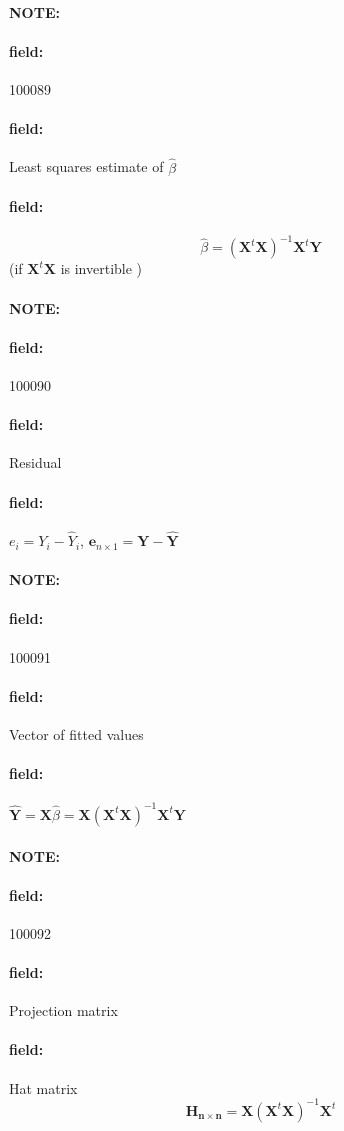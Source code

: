 \documentclass[12pt]{article}
\newenvironment{note}{\paragraph{NOTE:}}{}
\newenvironment{field}{\paragraph{field:}}{}
\begin{document}
\begin{note} \begin{field} \tiny 100089 \end{field}
 \begin{field}
  Least squares estimate of $\hat{\beta}$
 \end{field}
 \begin{field}
  $$ \hat{\beta} = (\mathbf{X}^t \mathbf{X})^{-1} \mathbf{X}^t \mathbf{Y} $$ (if $\mathbf{X}^t \mathbf{X}$ is invertible )
 \end{field}
\end{note}

\begin{note} \begin{field} \tiny 100090 \end{field}
 \begin{field}
  Residual
 \end{field}
 \begin{field}
  $e_i = Y_i - \hat{Y}_i$, $\mathbf{e}_{n\times 1} = \mathbf{Y} - \hat{\mathbf{Y}}$
 \end{field}
\end{note}

\begin{note} \begin{field} \tiny 100091 \end{field}
 \begin{field}
  Vector of fitted values
 \end{field}
 \begin{field}
  $\hat{\mathbf{Y}} = \mathbf{X}\hat{\beta} = \mathbf{X} (\mathbf{X}^t \mathbf{X})^{-1} \mathbf{X}^t \mathbf{Y}$
 \end{field}
\end{note}

\begin{note} \begin{field} \tiny 100092 \end{field}
 \begin{field}
  Projection matrix
 \end{field}
 \begin{field}
  Hat matrix
  $$\mathbf{H_{n \times n}} = \mathbf{X} (\mathbf{X}^t \mathbf{X})^{-1} \mathbf{X}^t$$
 \end{field}
\end{note}
\end{document}
